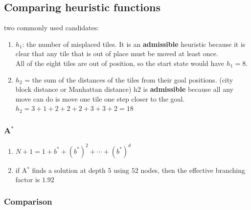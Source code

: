 \subsection{Comparing heuristic functions}

two commonly used candidates:
\begin{enumerate}
    \item $h_1$: the number of misplaced tiles.
    It is an \textbf{admissible} heuristic because it is clear that any tile that is out of place must be moved at least once.
    \hfill \cite{ai/book/Artificial-Intelligence-A-Modern-Approach/Russell-Norvig}
    \\
    All of the eight tiles are out of position, so the start state would have $h_1 = 8$.
    \hfill \cite{ai/book/Artificial-Intelligence-A-Modern-Approach/Russell-Norvig}

    \item $h_2$ = the sum of the distances of the tiles from their goal positions.
    (city block distance or Manhattan distance)
    h2 is \textbf{admissible} because all any move can do is move one tile one step closer to the goal.
    \hfill \cite{ai/book/Artificial-Intelligence-A-Modern-Approach/Russell-Norvig}
    \\
    $h_2 = 3 + 1 + 2 + 2 + 2 + 3 + 3 + 2 = 18$
    \hfill \cite{ai/book/Artificial-Intelligence-A-Modern-Approach/Russell-Norvig}
\end{enumerate}


\subsubsection{A$^\ast$ \cite{ai/book/Artificial-Intelligence-A-Modern-Approach/Russell-Norvig}}

\begin{enumerate}
    \item $N +1=1+ b^\ast + (b^\ast)^2 + \cdots + (b^\ast)^d$
    \hfill \cite{ai/book/Artificial-Intelligence-A-Modern-Approach/Russell-Norvig}

    \item if A$^\ast$ finds a solution at depth $5$ using $52$ nodes, then the effective branching factor is $1.92$
    \hfill \cite{ai/book/Artificial-Intelligence-A-Modern-Approach/Russell-Norvig}
\end{enumerate}



\subsubsection{Comparison \cite{ai/book/Artificial-Intelligence-A-Modern-Approach/Russell-Norvig}}

